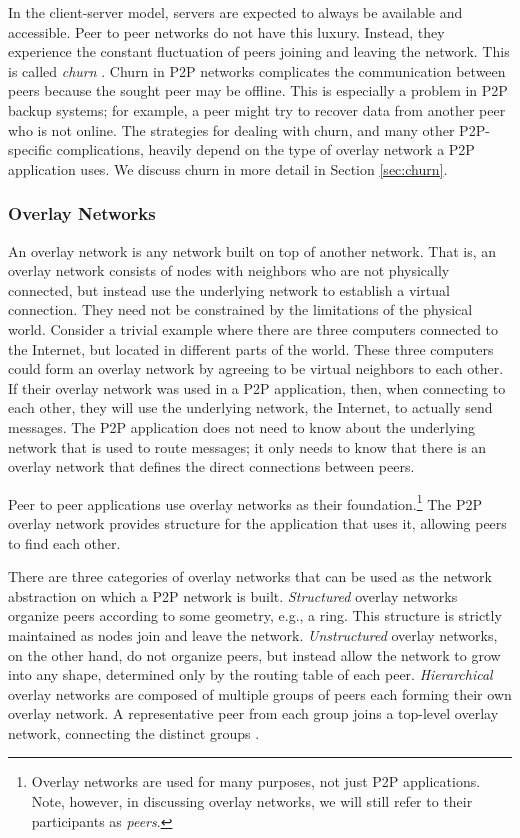 \documentclass[12pt]{report}
\begin{document}
In the client-server model, servers are expected to always be available and accessible. Peer to peer networks do not have this luxury. Instead, they experience the constant fluctuation of peers joining and leaving the network. This is called \textit{churn} \cite{StorageSearchP2PNetworks}. Churn in P2P networks complicates the communication between peers because the sought peer may be offline. This is especially a problem in P2P backup systems; for example, a peer might try to recover data from another peer who is not online. The strategies for dealing with churn, and many other P2P-specific complications, heavily depend on the type of overlay network a P2P application uses. We discuss churn in more detail in Section \ref{sec:churn}.

\subsubsection{Overlay Networks}

An overlay network is any network built on top of another network. That is, an overlay network consists of nodes with neighbors who are not physically connected, but instead use the underlying network to establish a virtual connection. They need not be constrained by the limitations of the physical world. Consider a trivial example where there are three computers connected to the Internet, but located in different parts of the world. These three computers could form an overlay network by agreeing to be virtual neighbors to each other. If their overlay network was used in a P2P application, then, when connecting to each other, they will use the underlying network, the Internet, to actually send messages. The P2P application does not need to know about the underlying network that is used to route messages; it only needs to know that there is an overlay network that defines the direct connections between peers.

Peer to peer applications use overlay networks as their foundation.\footnote{Overlay networks are used for many purposes, not just P2P applications. Note, however, in discussing overlay networks, we will still refer to their participants as \textit{peers}.}  The P2P overlay network provides structure for the application that uses it, allowing peers to find each other.

There are three categories of overlay networks that can be used as the network abstraction on which a P2P network is built. \textit{Structured} overlay networks organize peers according to some geometry, e.g., a ring. This structure is strictly maintained as nodes join and leave the network. \textit{Unstructured} overlay networks, on the other hand, do not organize peers, but instead allow the network to grow into any shape, determined only by the routing table of each peer. \textit{Hierarchical} overlay networks are composed of multiple groups of peers each forming their own overlay network. A representative peer from each group joins a top-level overlay network, connecting the distinct groups \cite{p2pSurvey}.
\end{document}
